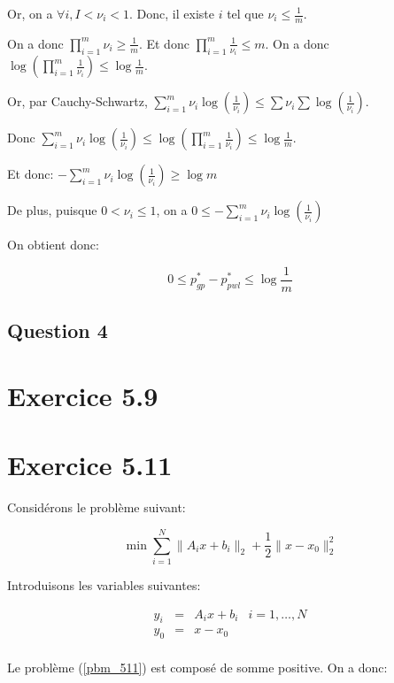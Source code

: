 \documentclass{article}
\begin{document}
Or, on a $\forall i, I < \nu_i < 1$. Donc, il existe $i$ tel que $\nu_i \leq
\frac{1}{m}$.

On a donc $\prod_{i = 1}^m \nu_i \geq \frac{1}{m}$. Et donc $\prod_{i = 1}^m
\frac{1}{\nu_i} \leq m$. On a donc $\log(\prod_{i = 1}^m \frac{1}{\nu_i}) \leq
\log \frac{1}{m}$.

Or, par Cauchy-Schwartz, $\sum_{i = 1}^m \nu_i \log(\frac{1}{\nu_i}) \leq \sum \nu_i \sum
\log(\frac{1}{\nu_i})$.

Donc $\sum_{i = 1}^m \nu_i \log(\frac{1}{\nu_i}) \leq \log(\prod_{i = 1}^m \frac{1}{\nu_i}) \leq
\log \frac{1}{m}$.

Et donc:
$- \sum_{i = 1}^m \nu_i \log(\frac{1}{\nu_i}) \geq
\log m$

De plus, puisque $0 < \nu_i \leq 1$, on a $ 0 \leq - \sum_{i = 1}^m \nu_i \log(\frac{1}{\nu_i})$

On obtient donc:

\begin{equation*}
0 \leq p^*_{gp} - p^*_{pwl} \leq \log \frac{1}{m}
\end{equation*}

\subsection{Question 4}



\section{Exercice 5.9}

\section{Exercice 5.11}

Considérons le problème suivant:

\begin{equation}
\label{pbm_511}
\min \sum_{i = 1}^N \| A_i x + b_i \|_2 + \frac{1}{2} \| x - x_0 \|_2^2
\end{equation}

Introduisons les variables suivantes:

\begin{align*}
y_i & = & A_i x + b_i & i = 1, \dots, N \\
y_0 & = & x - x_0 & \\
\end{align*}

Le problème (\ref{pbm_511}) est composé de somme positive. On a donc:
\end{document}
